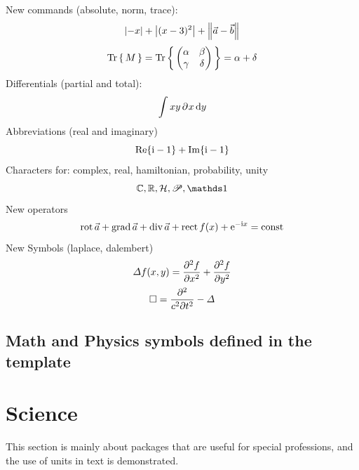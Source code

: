 \begin{filecontents*}{\democodefile}
New commands (absolute, norm, trace):
\begin{equation}
\abs{-x} + \Abs{(x-3)^2} + \norm{\vec a - \vec b}
\end{equation}
%
\begin{equation}
\Trace{M} = \Trace{\begin{pmatrix} 
			  \alpha & \beta\\ 
			  \gamma & \delta 
				   \end{pmatrix}} = \alpha + \delta
\end{equation}
%
Differentials (partial and total):
\begin{equation}
	\int x y \, \pd x \td y
\end{equation}
%
Abbreviations (real and imaginary)
\begin{equation}
\Re\{\i - 1\} + \Im\{\i - 1\}
\end{equation}
%
Characters for: complex, real, hamiltonian, probability, unity
\begin{equation}
\complex, \real, \Ham, \Prob, \unity
\end{equation} 
%
New operators
\begin{equation}
\rot \vec{a} + \grad \vec{a} + \div \vec{a} + \rect f(x) + \e^{-\i x} = \const
\end{equation} 
%
New Symbols (laplace, dalembert)
\begin{gather}
\laplace f(x,y) = \frac{\partial^2 f}{\partial x^2} + \frac{\partial^2 f}{\partial y^2} \\
\dalembert = \frac{\partial ^2}{c^2\partial t^2} - \laplace
\end{gather} 
%
\end{filecontents*}

\subsection{Math and Physics symbols defined in the template}

%

\clearpage
\section{Science}
This section is mainly about packages that are useful for special professions,
and the use of units in text is demonstrated.

